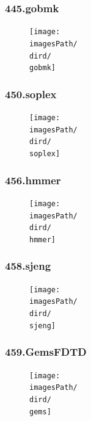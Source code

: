\documentclass[12pt,a4paper]{article}
\newcommand{\imagesPath}{/home/nick/arch-ntua/ex02/graphs}
\newcommand{\gobmk}{445.gobmk.cslab_branch_predictors.out.pdf}
\newcommand{\soplex}{450.soplex.cslab_branch_predictors.out.pdf}
\newcommand{\hmmer}{456.hmmer.cslab_branch_predictors.out.pdf}
\newcommand{\sjeng}{458.sjeng.cslab_branch_predictors.out.pdf}
\newcommand{\gems}{459.GemsFDTD.cslab_branch_predictors.out.pdf}
\newcommand{\dird}{4.4}
\begin{document}
			\subsubsection{445.gobmk}
				\begin{figure}[H]
					\begin{center}
						 \texttt{[image: \\imagesPath/\\dird/\\gobmk]}
					\end{center}
				\end{figure}
			
			\subsubsection{450.soplex}
				\begin{figure}[H]
					\begin{center}
						 \texttt{[image: \\imagesPath/\\dird/\\soplex]}
					\end{center}
				\end{figure}
			
			\subsubsection{456.hmmer}
				\begin{figure}[H]
					\begin{center}
						 \texttt{[image: \\imagesPath/\\dird/\\hmmer]}
					\end{center}
				\end{figure}
			
			\subsubsection{458.sjeng}
				\begin{figure}[H]
					\begin{center}
						 \texttt{[image: \\imagesPath/\\dird/\\sjeng]}
					\end{center}
				\end{figure}
			
			\subsubsection{459.GemsFDTD}
				\begin{figure}[H]
					\begin{center}
						 \texttt{[image: \\imagesPath/\\dird/\\gems]}
					\end{center}
				\end{figure}
			
\end{document}
